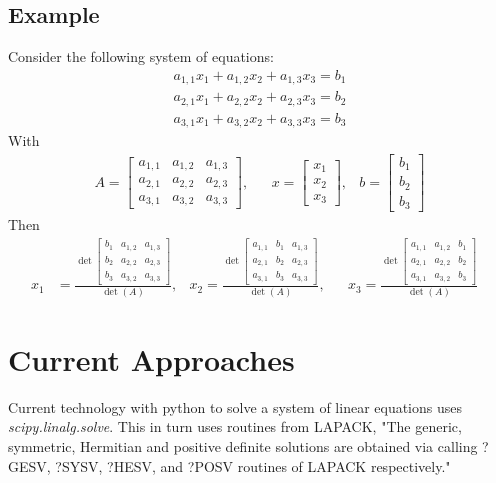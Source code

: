 \documentclass[12pt]{article}
\begin{document}
\subsection{Example}
Consider the following system of equations:
\begin{align*}
	a_{1,1}x_1 + a_{1,2}x_2 + a_{1,3}x_3 = b_1 \\
	a_{2,1}x_1 + a_{2,2}x_2 + a_{2,3}x_3 = b_2 \\
	a_{3,1}x_1 + a_{3,2}x_2 + a_{3,3}x_3 = b_3
\end{align*}
With
\begin{align*}
	&A = \begin{bmatrix}
		a_{1,1} & a_{1,2} & a_{1,3} \\
		a_{2,1} & a_{2,2} & a_{2,3} \\
		a_{3,1} & a_{3,2} & a_{3,3}
	\end{bmatrix}, &
	&x = \begin{bmatrix}x_1 \\	x_2 \\	x_3	\end{bmatrix}, & 
	b = \begin{bmatrix} b_1 \\	b_2 \\	b_3	\end{bmatrix}&
\end{align*}
Then
\begin{align*}
	x_1 &= \frac{\det\begin{bmatrix}
			b_1 & a_{1,2} & a_{1,3} \\
			b_2 & a_{2,2} & a_{2,3} \\
			b_3 & a_{3,2} & a_{3,3}
		\end{bmatrix}
	}{\det(A)}, &
	x_2 = \frac{\det\begin{bmatrix}
			a_{1,1} & b_1 & a_{1,3} \\
			a_{2,1} & b_2 & a_{2,3} \\
			a_{3,1} & b_3 & a_{3,3}
		\end{bmatrix}
	}{\det(A)}, & &
	x_3 = \frac{\det\begin{bmatrix}
			a_{1,1} & a_{1,2} & b_1 \\
			a_{2,1} & a_{2,2} & b_2 \\
			a_{3,1} & a_{3,2} & b_3
		\end{bmatrix}
	}{\det(A)}&
\end{align*}


\section{Current Approaches}
Current technology with python to solve a system of linear equations uses \textit{scipy.linalg.solve}. This in turn uses routines from LAPACK, "The generic, symmetric, Hermitian and positive definite solutions are obtained via calling ?GESV, ?SYSV, ?HESV, and ?POSV routines of LAPACK respectively."
\end{document}
